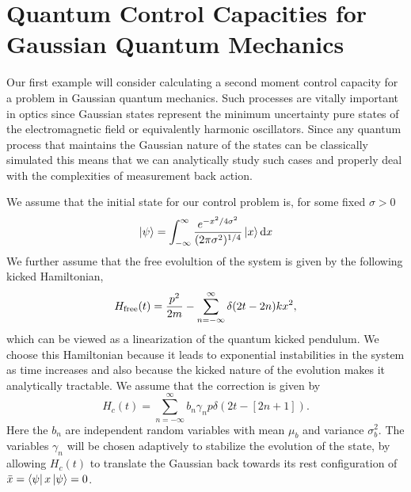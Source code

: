 \documentclass[superscriptaddress,aps,pra,nofootinbib,onecolumn,notitlepage,10pt]{revtex4-1}
\def\bra#1{\mathinner{\langle{#1}|}}
\def\ket#1{\mathinner{|{#1}\rangle}}
\begin{document}
\section{Quantum Control Capacities for Gaussian Quantum Mechanics}
Our first example will consider calculating a second moment control capacity for a problem in Gaussian quantum mechanics.
Such processes are vitally important in optics since Gaussian states represent the minimum uncertainty pure states
of the electromagnetic field or equivalently harmonic oscillators.  Since any quantum process that maintains the Gaussian
nature of the states can be classically simulated this means that we can analytically study such cases and properly deal
with the complexities of measurement back action.

We assume that the initial state for our control problem is, for some fixed $\sigma>0$
\begin{equation}
\ket{\psi} = \int_{-\infty}^\infty \frac{e^{-x^2/4\sigma^2}}{(2\pi \sigma^2)^{1/4}}\ket{x}\mathrm{d}x\label{eq:psi0}
\end{equation}
We further assume that the free evolultion of the system is given by the following kicked Hamiltonian,
\begin{equation}
H_{\rm free}(t) = \frac{p^2}{2m} - \sum_{n=-\infty}^\infty \delta(2t-2n) k x^2,
\end{equation}
which can be viewed as a linearization of the quantum kicked pendulum.  We choose this Hamiltonian because it leads to exponential instabilities
in the system as time increases and also because the kicked nature of the evolution makes it analytically tractable.
We assume that the correction is given by
\begin{equation}
H_{c}(t) = \sum_{n=-\infty}^\infty b_n \gamma_n p\delta(2t-[2n+1]).
\end{equation}
Here the $b_n$ are independent random variables with mean $\mu_b$ and variance $\sigma_b^2$.  The variables $\gamma_n$ will be chosen adaptively to stabilize the evolution of the state, by allowing $H_c(t)$ to translate the Gaussian back towards its rest configuration of $\bar{x} = \bra{\psi} x \ket{\psi}=0$.
\end{document}
